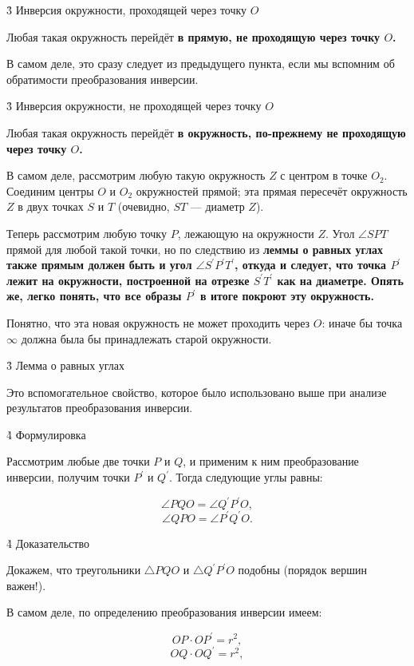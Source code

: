 \h3{ Инверсия окружности, проходящей через точку $O$ }

Любая такая окружность перейдёт \bf{в прямую}, не проходящую через точку $O$.

В самом деле, это сразу следует из предыдущего пункта, если мы вспомним об обратимости преобразования инверсии.


\h3{ Инверсия окружности, не проходящей через точку $O$ }

Любая такая окружность перейдёт \bf{в окружность}, по-прежнему не проходящую через точку $O$.


В самом деле, рассмотрим любую такую окружность $Z$ с центром в точке $O_2$. Соединим центры $O$ и $O_2$ окружностей прямой; эта прямая пересечёт окружность $Z$ в двух точках $S$ и $T$ (очевидно, $ST$ --- диаметр $Z$).

Теперь рассмотрим любую точку $P$, лежающую на окружности $Z$. Угол $\angle SPT$ прямой для любой такой точки, но по следствию из \bf{леммы о равных углах} также прямым должен быть и угол $\angle S^\prime P^\prime T^\prime$, откуда и следует, что точка $P^\prime$ лежит на окружности, построенной на отрезке $S^\prime T^\prime$ как на диаметре. Опять же, легко понять, что все образы $P^\prime$ в итоге покроют эту окружность.

Понятно, что эта новая окружность не может проходить через $O$: иначе бы точка $\infty$ должна была бы принадлежать старой окружности.


\h3{ Лемма о равных углах }

Это вспомогательное свойство, которое было использовано выше при анализе результатов преобразования инверсии.

\h4{ Формулировка }

Рассмотрим любые две точки $P$ и $Q$, и применим к ним преобразование инверсии, получим точки $P^\prime$ и $Q^\prime$. Тогда следующие углы равны:

$$ \angle PQO = \angle Q^\prime P^\prime O, $$
$$ \angle QPO = \angle P^\prime Q^\prime O. $$

\h4{ Доказательство }

Докажем, что треугольники $\triangle PQO$ и $\triangle Q^\prime P^\prime O$ подобны (порядок вершин важен!).


В самом деле, по определению преобразования инверсии имеем:

$$ OP \cdot OP^\prime = r^2, $$
$$ OQ \cdot OQ^\prime = r^2, $$

